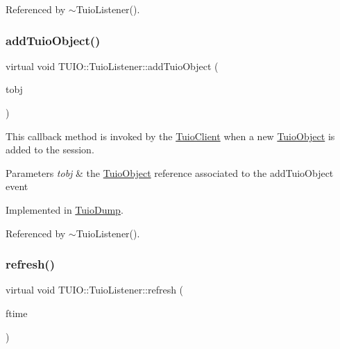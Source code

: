 Referenced by $\sim$\+Tuio\+Listener().

\mbox{\label{class_t_u_i_o_1_1_tuio_listener_a7180002e5898259cecdb8b614a0f67ff}} 
\subsubsection{\texorpdfstring{add\+Tuio\+Object()}{addTuioObject()}}
{\footnotesize\ttfamily virtual void T\+U\+I\+O\+::\+Tuio\+Listener\+::add\+Tuio\+Object (\begin{DoxyParamCaption}\item[{\hyperlink{class_t_u_i_o_1_1_tuio_object}{Tuio\+Object} $\ast$}]{tobj }\end{DoxyParamCaption})\hspace{0.3cm}{\ttfamily [pure virtual]}}

This callback method is invoked by the \hyperlink{class_t_u_i_o_1_1_tuio_client}{Tuio\+Client} when a new \hyperlink{class_t_u_i_o_1_1_tuio_object}{Tuio\+Object} is added to the session.


\begin{DoxyParams}{Parameters}
{\em tobj} & the \hyperlink{class_t_u_i_o_1_1_tuio_object}{Tuio\+Object} reference associated to the add\+Tuio\+Object event \\
\hline
\end{DoxyParams}


Implemented in \hyperlink{class_tuio_dump_a978520453aaf17d3409ae13573b7334f}{Tuio\+Dump}.



Referenced by $\sim$\+Tuio\+Listener().

\mbox{\label{class_t_u_i_o_1_1_tuio_listener_a14d16f24c27bb22fe2e24419e447dd63}} 
\subsubsection{\texorpdfstring{refresh()}{refresh()}}
{\footnotesize\ttfamily virtual void T\+U\+I\+O\+::\+Tuio\+Listener\+::refresh (\begin{DoxyParamCaption}\item[{\hyperlink{class_t_u_i_o_1_1_tuio_time}{Tuio\+Time}}]{ftime }\end{DoxyParamCaption})\hspace{0.3cm}{\ttfamily [pure virtual]}}


